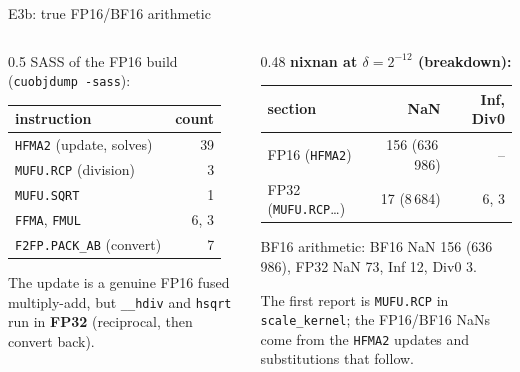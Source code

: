 \documentclass[aspectratio=169,10pt,xcolor=table]{beamer}
\begin{document}
\begin{frame}{E3b: true FP16/BF16 arithmetic}
\footnotesize
\begin{columns}[T]\begin{column}{0.5\textwidth}
SASS of the FP16 build (\texttt{cuobjdump -sass}):

\vspace{1mm}
\begin{tabular}{lr}
\toprule
instruction & count\\
\midrule
\texttt{HFMA2} (update, solves) & 39\\
\texttt{MUFU.RCP} (division) & 3\\
\texttt{MUFU.SQRT} & 1\\
\texttt{FFMA}, \texttt{FMUL} & 6, 3\\
\texttt{F2FP.PACK\_AB} (convert) & 7\\
\bottomrule
\end{tabular}

\vspace{2mm}
The update is a genuine FP16 fused multiply-add, but \texttt{\_\_hdiv} and \texttt{hsqrt} run in \textbf{FP32} (reciprocal, then convert back).
\end{column}\begin{column}{0.48\textwidth}
\textbf{nixnan at $\delta=2^{-12}$ (breakdown):}\\[1mm]
\begin{tabular}{lrr}
\toprule
section & NaN & Inf, Div0\\
\midrule
FP16 (\texttt{HFMA2}) & 156 (636\,986) & --\\
FP32 (\texttt{MUFU.RCP}\ldots) & 17 (8\,684) & 6, 3\\
\bottomrule
\end{tabular}

\vspace{1mm}
BF16 arithmetic: BF16 NaN 156 (636\,986), FP32 NaN 73, Inf 12, Div0 3.

\vspace{2mm}
The first report is \texttt{MUFU.RCP} in \texttt{scale\_kernel}; the FP16/BF16 NaNs come from the \texttt{HFMA2} updates and substitutions that follow.
\end{column}\end{columns}

\vspace{3mm}\centering
{}
\end{frame}
\end{document}
